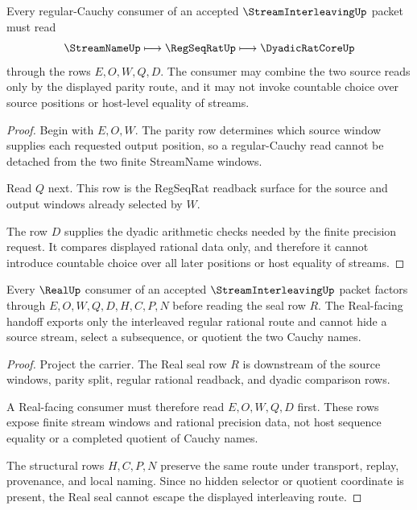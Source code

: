 \begin{theorem}
\label{thm:stream-interleaving-regseqrat-readback}
Every regular-Cauchy consumer of an accepted $\StreamInterleavingUp$ packet must read
$$
\StreamNameUp
\longmapsto
\RegSeqRatUp
\longmapsto
\DyadicRatCoreUp
$$
through the rows $E,O,W,Q,D$. The consumer may combine the two source reads only by the displayed parity route, and it may not invoke countable choice over source positions or host-level equality of streams.
\end{theorem}
\begin{proof}
Begin with $E,O,W$. The parity row determines which source window supplies each requested output position, so a regular-Cauchy read cannot be detached from the two finite StreamName windows.

Read $Q$ next. This row is the RegSeqRat readback surface for the source and output windows already selected by $W$.

The row $D$ supplies the dyadic arithmetic checks needed by the finite precision request. It compares displayed rational data only, and therefore it cannot introduce countable choice over all later positions or host equality of streams.
\end{proof}

\begin{theorem}
\label{thm:stream-interleaving-real-seal-nonescape}
Every $\RealUp$ consumer of an accepted $\StreamInterleavingUp$ packet factors through $E,O,W,Q,D,H,C,P,N$ before reading the seal row $R$. The Real-facing handoff exports only the interleaved regular rational route and cannot hide a source stream, select a subsequence, or quotient the two Cauchy names.
\end{theorem}
\begin{proof}
Project the carrier. The Real seal row $R$ is downstream of the source windows, parity split, regular rational readback, and dyadic comparison rows.

A Real-facing consumer must therefore read $E,O,W,Q,D$ first. These rows expose finite stream windows and rational precision data, not host sequence equality or a completed quotient of Cauchy names.

The structural rows $H,C,P,N$ preserve the same route under transport, replay, provenance, and local naming. Since no hidden selector or quotient coordinate is present, the Real seal cannot escape the displayed interleaving route.
\end{proof}

